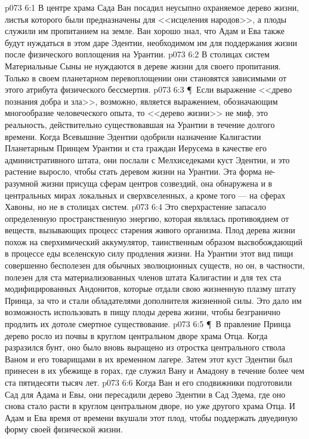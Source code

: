 \vs p073 6:1 В центре храма Сада Ван посадил неусыпно охраняемое дерево жизни, листья которого были предназначены для <<исцеления народов>>, а плоды служили им пропитанием на земле. Ван хорошо знал, что Адам и Ева также будут нуждаться в этом даре Эдентии, необходимом им для поддержания жизни после физического воплощения на Урантии.
\vs p073 6:2 В столицах систем Материальные Сыны не нуждаются в дереве жизни для своего пропитания. Только в своем планетарном перевоплощении они становятся зависимыми от этого атрибута физического бессмертия.
\vs p073 6:3 \P\ Если выражение <<древо познания добра и зла>>, возможно, является выражением, обозначающим многообразие человеческого опыта, то <<дерево жизни>> не миф, это реальность, действительно существовавшая на Урантии в течение долгого времени. Когда Всевышние Эдентии одобрили назначение Калигастии Планетарным Принцем Урантии и ста граждан Иерусема в качестве его административного штата, они послали с Мелхиседеками куст Эдентии, и это растение выросло, чтобы стать деревом жизни на Урантии. Эта форма не\hyp{}разумной жизни присуща сферам центров созвездий, она обнаружена и в центральных мирах локальных и сверхвселенных, а кроме того --- на сферах Хавоны, но не в столицах систем.
\vs p073 6:4 Это сверхрастение запасало определенную пространственную энергию, которая являлась противоядием от веществ, вызывающих процесс старения живого организма. Плод дерева жизни похож на сверхимический аккумулятор, таинственным образом высвобождающий в процессе еды вселенскую силу продления жизни. На Урантии этот вид пищи совершенно бесполезен для обычных эволюционных существ, но он, в частности, полезен для ста материализованных членов штата Калигастии и для тех ста модифицированных Андонитов, которые отдали свою жизненную плазму штату Принца, за что и стали обладателями дополнителя жизненной силы. Это дало им возможность использовать в пищу плоды дерева жизни, чтобы безгранично продлить их дотоле смертное существование.
\vs p073 6:5 \P\ В правление Принца дерево росло из почвы в круглом центральном дворе храма Отца. Когда разразился бунт, оно было вновь выращено из отростка центрального ствола Ваном и его товарищами в их временном лагере. Затем этот куст Эдентии был принесен в их убежище в горах, где служил Вану и Амадону в течение более чем ста пятидесяти тысяч лет.
\vs p073 6:6 Когда Ван и его сподвижники подготовили Сад для Адама и Евы, они пересадили дерево Эдентии в Сад Эдема, где оно снова стало расти в круглом центральном дворе, но уже другого храма Отца. И Адам и Ева время от времени вкушали этот плод, чтобы поддержать двуединую форму своей физической жизни.
